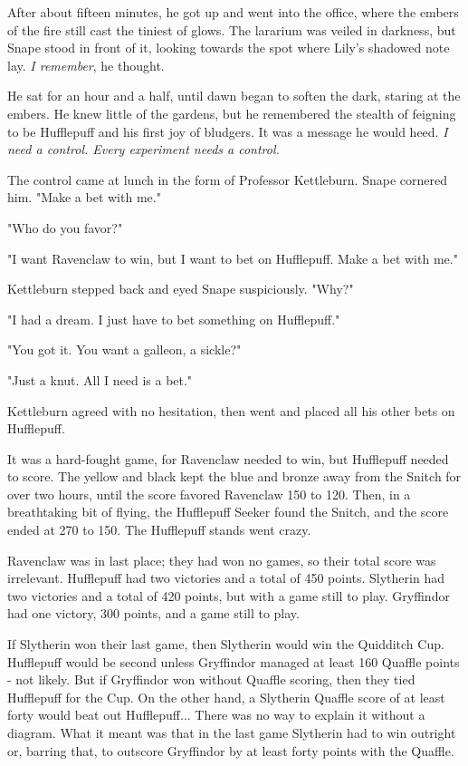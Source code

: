\documentclass[a4paper,11pt]{article}
\begin{document}
After about fifteen minutes, he got up and went into the office, where the embers of the fire still cast the tiniest of glows. The lararium was veiled in darkness, but Snape stood in front of it, looking towards the spot where Lily's shadowed note lay. \emph{I remember}, he thought.

He sat for an hour and a half, until dawn began to soften the dark, staring at the embers. He knew little of the gardens, but he remembered the stealth of feigning to be Hufflepuff and his first joy of bludgers. It was a message he would heed. \emph{I need a control. Every experiment needs a control.}

The control came at lunch in the form of Professor Kettleburn. Snape cornered him. "Make a bet with me."

"Who do you favor?"

"I want Ravenclaw to win, but I want to bet on Hufflepuff. Make a bet with me."

Kettleburn stepped back and eyed Snape suspiciously. "Why?"

"I had a dream. I just have to bet something on Hufflepuff."

"You got it. You want a galleon, a sickle?"

"Just a knut. All I need is a bet."

Kettleburn agreed with no hesitation, then went and placed all his other bets on Hufflepuff.

It was a hard-fought game, for Ravenclaw needed to win, but Hufflepuff needed to score. The yellow and black kept the blue and bronze away from the Snitch for over two hours, until the score favored Ravenclaw 150 to 120. Then, in a breathtaking bit of flying, the Hufflepuff Seeker found the Snitch, and the score ended at 270 to 150. The Hufflepuff stands went crazy.

Ravenclaw was in last place; they had won no games, so their total score was irrelevant. Hufflepuff had two victories and a total of 450 points. Slytherin had two victories and a total of 420 points, but with a game still to play. Gryffindor had one victory, 300 points, and a game still to play.

If Slytherin won their last game, then Slytherin would win the Quidditch Cup. Hufflepuff would be second unless Gryffindor managed at least 160 Quaffle points - not likely. But if Gryffindor won without Quaffle scoring, then they tied Hufflepuff for the Cup. On the other hand, a Slytherin Quaffle score of at least forty would beat out Hufflepuff... There was no way to explain it without a diagram. What it meant was that in the last game Slytherin had to win outright or, barring that, to outscore Gryffindor by at least forty points with the Quaffle.
\end{document}

